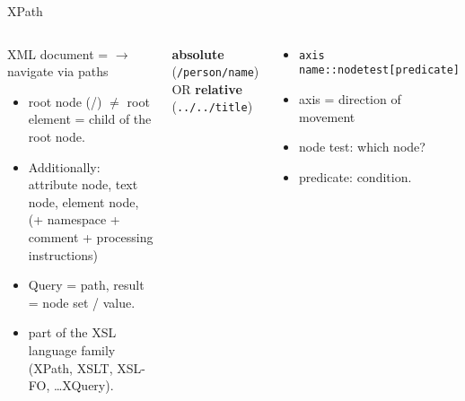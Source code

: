 \begin{frame}[allowframebreaks]{XPath}
\small
{}
\begin{columns}
\begin{block}{}
XML document =  $\to$ navigate via paths  
\begin{itemize}
\item root node (/) $\neq$ root element = child of the root node. 
\item Additionally: attribute node, text node, element node, (+ namespace + comment + processing instructions) 
\item Query = path, result = node set / value. 
\item part of the XSL language family (XPath, XSLT, XSL-FO, \dots XQuery).
\end{itemize}
\end{block}

\textbf{absolute} (\texttt{/person/name}) OR
\textbf{relative} (\texttt{../../title}) 


\begin{block}{}
\begin{itemize}
    \item \texttt{axis name::nodetest[predicate]} 
    \item axis = direction of movement 
    \item node test: which node? 
    \item predicate: condition.
\end{itemize}
\end{block}

\end{columns}

\framebreak



\\

\end{frame}

